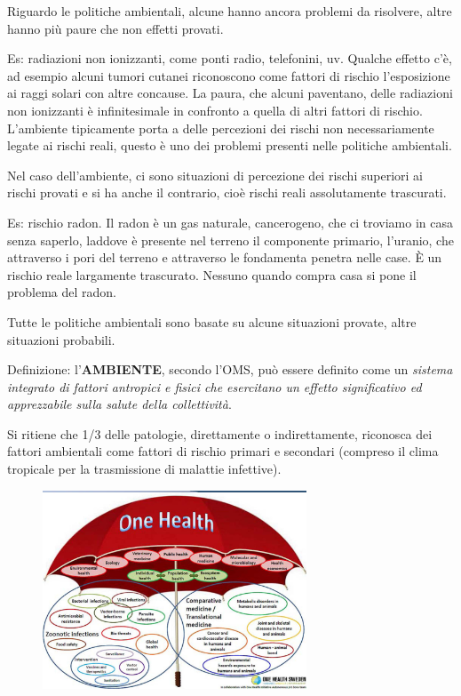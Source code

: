 Riguardo le politiche ambientali, alcune hanno ancora problemi da
risolvere, altre hanno più paure che non effetti provati.

Es: radiazioni non ionizzanti, come ponti radio, telefonini, uv. Qualche
effetto c'è, ad esempio alcuni tumori cutanei riconoscono come fattori
di rischio l'esposizione ai raggi solari con altre concause. La paura,
che alcuni paventano, delle radiazioni non ionizzanti è infinitesimale
in confronto a quella di altri fattori di rischio. L'ambiente
tipicamente porta a delle percezioni dei rischi non necessariamente
legate ai rischi reali, questo è uno dei problemi presenti nelle
politiche ambientali.

Nel caso dell'ambiente, ci sono situazioni di percezione dei rischi
superiori ai rischi provati e si ha anche il contrario, cioè rischi
reali assolutamente trascurati.

Es: rischio radon. Il radon è un gas naturale, cancerogeno, che ci
troviamo in casa senza saperlo, laddove è presente nel terreno il
componente primario, l'uranio, che attraverso i pori del terreno e
attraverso le fondamenta penetra nelle case. È un rischio reale
largamente trascurato. Nessuno quando compra casa si pone il problema
del radon.

Tutte le politiche ambientali sono basate su alcune situazioni provate,
altre situazioni probabili.

Definizione: l'\textbf{AMBIENTE}, secondo l'OMS, può essere definito
come un \emph{sistema integrato di fattori antropici e fisici che
esercitano un effetto significativo ed apprezzabile sulla salute della
collettività}.

Si ritiene che 1/3 delle patologie, direttamente o indirettamente,
riconosca dei fattori ambientali come fattori di rischio primari e
secondari (compreso il clima tropicale per la trasmissione di malattie
infettive).

\begin{figure}[!ht]
\centering
	\includegraphics[width=0.7\textwidth]{22/image1.jpeg}
	\end{figure}


